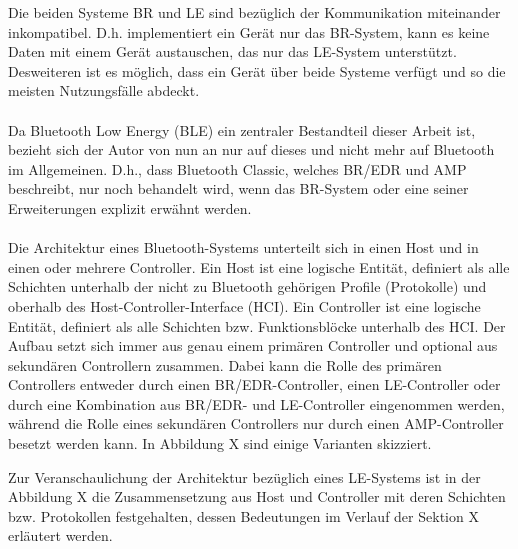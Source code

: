 Die beiden Systeme BR und LE sind bezüglich der Kommunikation miteinander inkompatibel. D.h. implementiert ein Gerät nur das BR-System, kann es keine Daten mit einem Gerät austauschen, das nur das LE-System unterstützt. Desweiteren ist es möglich, dass ein Gerät über beide Systeme verfügt und so die meisten Nutzungsfälle abdeckt.
\\\\
Da Bluetooth Low Energy (BLE) ein zentraler Bestandteil dieser Arbeit ist, bezieht sich der Autor von nun an nur auf dieses und nicht mehr auf Bluetooth im Allgemeinen. D.h., dass Bluetooth Classic, welches BR/EDR und AMP beschreibt, nur noch behandelt wird, wenn das BR-System oder eine seiner Erweiterungen explizit erwähnt werden.
\\\\
Die Architektur eines Bluetooth-Systems unterteilt sich in einen Host und in einen oder mehrere Controller. Ein Host ist eine logische Entität, definiert als alle Schichten unterhalb der nicht zu Bluetooth gehörigen Profile (Protokolle) und oberhalb des Host-Controller-Interface (HCI). Ein Controller ist eine logische Entität, definiert als alle Schichten bzw. Funktionsblöcke unterhalb des HCI. Der Aufbau setzt sich immer aus genau einem primären Controller und optional aus sekundären Controllern zusammen. Dabei kann die Rolle des primären Controllers entweder durch einen BR/EDR-Controller, einen LE-Controller oder durch eine Kombination aus BR/EDR- und LE-Controller eingenommen werden, während die Rolle eines sekundären Controllers nur durch einen AMP-Controller besetzt werden kann. In Abbildung X
 sind einige Varianten skizziert. 


Zur Veranschaulichung der Architektur bezüglich eines LE-Systems ist in der Abbildung X
die Zusammensetzung aus Host und Controller mit deren Schichten bzw. Protokollen festgehalten, dessen Bedeutungen im Verlauf der Sektion X
erläutert werden.

